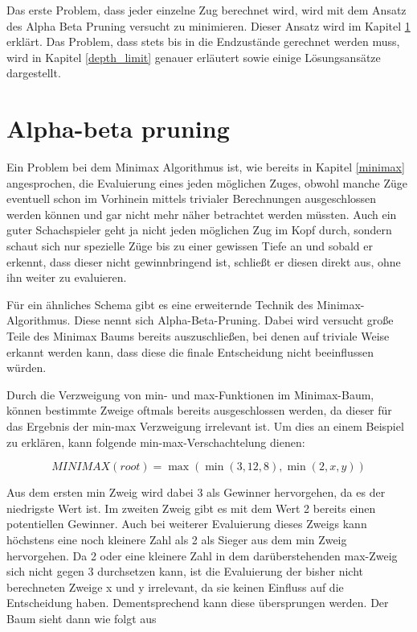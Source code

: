 
Das erste Problem, dass jeder einzelne Zug berechnet wird, wird mit dem Ansatz des Alpha Beta Pruning versucht zu minimieren. Dieser Ansatz wird im Kapitel \ref{alpha_beta} erklärt. Das Problem, dass stets bis in die Endzustände gerechnet werden muss, wird in Kapitel \ref{depth_limit} genauer erläutert sowie einige Lösungsansätze dargestellt.




\section{Alpha-beta pruning}\label{alpha_beta}

Ein Problem bei dem Minimax Algorithmus ist, wie bereits in Kapitel \ref{minimax} angesprochen, die Evaluierung eines jeden möglichen Zuges, obwohl manche Züge eventuell schon im Vorhinein mittels trivialer Berechnungen ausgeschlossen werden können und gar nicht mehr näher betrachtet werden müssten. Auch ein guter Schachspieler geht ja nicht jeden möglichen Zug im Kopf durch, sondern schaut sich nur spezielle Züge bis zu einer gewissen Tiefe an und sobald er erkennt, dass dieser nicht gewinnbringend ist, schließt er diesen direkt aus, ohne ihn weiter zu evaluieren.

Für ein ähnliches Schema gibt es eine erweiternde Technik des Minimax-Algorithmus. Diese nennt sich Alpha-Beta-Pruning. Dabei wird versucht große Teile des Minimax Baums bereits auszuschließen, bei denen auf triviale Weise erkannt werden kann, dass diese die finale Entscheidung nicht beeinflussen würden. 

Durch die Verzweigung von min- und max-Funktionen im Minimax-Baum, können bestimmte Zweige oftmals bereits ausgeschlossen werden, da dieser für das Ergebnis der min-max Verzweigung irrelevant ist. \cite{Russell2010} Um dies an einem Beispiel zu erklären, kann folgende min-max-Verschachtelung dienen:

\begin{equation}
MINIMAX(root) = \max(\min(3,12,8), \min(2,x,y))
\end{equation}

Aus dem ersten min Zweig wird dabei 3 als Gewinner hervorgehen, da es der niedrigste Wert ist. Im zweiten Zweig gibt es mit dem Wert 2 bereits einen potentiellen Gewinner. Auch bei weiterer Evaluierung dieses Zweigs kann höchstens eine noch kleinere Zahl als 2 als Sieger aus dem min Zweig hervorgehen. Da 2 oder eine kleinere Zahl in dem darüberstehenden max-Zweig sich nicht gegen 3 durchsetzen kann, ist die Evaluierung der bisher nicht berechneten Zweige x und y irrelevant, da sie keinen Einfluss auf die Entscheidung haben. Dementsprechend kann diese übersprungen werden. Der Baum sieht dann wie folgt aus

